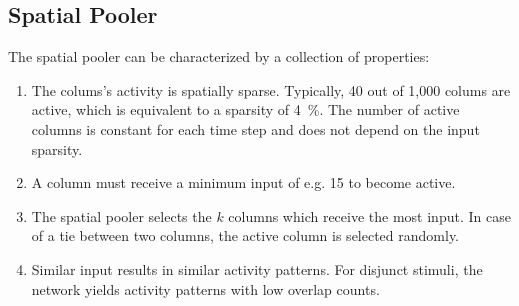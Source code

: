 \subsection{Spatial Pooler}
\label{sec:spatial_pooler_properties}

The spatial pooler can be characterized by a collection of properties:

\begin{enumerate}
	\item\label{enm:spatial_pooler_sparsity} The colums's activity is spatially sparse. Typically, 40 out of 1,000 colums are active, which is equivalent to a sparsity of \SI{4}{\%}. The number of active columns is constant for each time step and does not depend on the input sparsity.
	\item\label{enm:spatial_pooler_minimum} A column must receive a minimum input of e.g. 15 to become active.
	\item\label{enm:spatial_pooler_selection} The spatial pooler selects the $k$ columns which receive the most input. In case of a tie between two columns, the active column is selected randomly.
	\item\label{enm:spatial_pooler_overlap} Similar input results in similar activity patterns. For disjunct stimuli, the network yields activity patterns with low overlap counts.
\end{enumerate}
